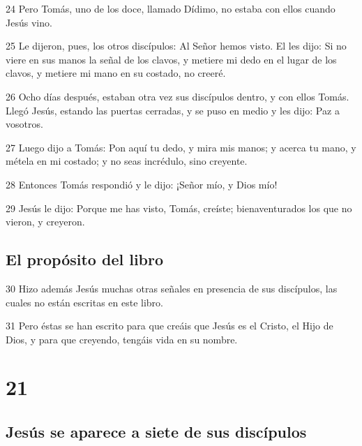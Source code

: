 \par 24 Pero Tomás, uno de los doce, llamado Dídimo, no estaba con ellos cuando Jesús vino.
\par 25 Le dijeron, pues, los otros discípulos: Al Señor hemos visto. El les dijo: Si no viere en sus manos la señal de los clavos, y metiere mi dedo en el lugar de los clavos, y metiere mi mano en su costado, no creeré.
\par 26 Ocho días después, estaban otra vez sus discípulos dentro, y con ellos Tomás. Llegó Jesús, estando las puertas cerradas, y se puso en medio y les dijo: Paz a vosotros.
\par 27 Luego dijo a Tomás: Pon aquí tu dedo, y mira mis manos; y acerca tu mano, y métela en mi costado; y no seas incrédulo, sino creyente.
\par 28 Entonces Tomás respondió y le dijo: ¡Señor mío, y Dios mío!
\par 29 Jesús le dijo: Porque me has visto, Tomás, creíste; bienaventurados los que no vieron, y creyeron.

\section*{El propósito del libro}

\par 30 Hizo además Jesús muchas otras señales en presencia de sus discípulos, las cuales no están escritas en este libro.
\par 31 Pero éstas se han escrito para que creáis que Jesús es el Cristo, el Hijo de Dios, y para que creyendo, tengáis vida en su nombre.

\chapter{21}

\section*{Jesús se aparece a siete de sus discípulos}

